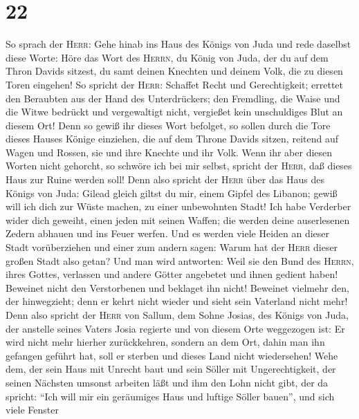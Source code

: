 \hypertarget{section-21}{%
\section{22}\label{section-21}}

 So sprach der \textsc{Herr}: Gehe hinab ins Haus des
Königs von Juda und rede daselbst diese Worte:  Höre das
Wort des \textsc{Herrn}, du König von Juda, der du auf dem Thron Davids
sitzest, du samt deinen Knechten und deinem Volk, die zu diesen Toren
eingehen!  So spricht der \textsc{Herr}: Schaffet Recht
und Gerechtigkeit; errettet den Beraubten aus der Hand des
Unterdrückers; den Fremdling, die Waise und die Witwe bedrückt und
vergewaltigt nicht, vergießet kein unschuldiges Blut an diesem Ort!
 Denn so gewiß ihr dieses Wort befolget, so sollen durch
die Tore dieses Hauses Könige einziehen, die auf dem Throne Davids
sitzen, reitend auf Wagen und Rossen, sie und ihre Knechte und ihr Volk.
 Wenn ihr aber diesen Worten nicht gehorcht, so schwöre
ich bei mir selbst, spricht der \textsc{Herr}, daß dieses Haus zur Ruine
werden soll!  Denn also spricht der \textsc{Herr} über das
Haus des Königs von Juda: Gilead gleich giltst du mir, einem Gipfel des
Libanon; gewiß will ich dich zur Wüste machen, zu einer unbewohnten
Stadt!  Ich habe Verderber wider dich geweiht, einen jeden
mit seinen Waffen; die werden deine auserlesenen Zedern abhauen und ins
Feuer werfen.  Und es werden viele Heiden an dieser Stadt
vorüberziehen und einer zum andern sagen: Warum hat der \textsc{Herr}
dieser großen Stadt also getan?  Und man wird antworten:
Weil sie den Bund des \textsc{Herrn}, ihres Gottes, verlassen und andere
Götter angebetet und ihnen gedient haben!  Beweinet nicht
den Verstorbenen und beklaget ihn nicht! Beweinet vielmehr den, der
hinwegzieht; denn er kehrt nicht wieder und sieht sein Vaterland nicht
mehr!  Denn also spricht der \textsc{Herr} von Sallum,
dem Sohne Josias, des Königs von Juda, der anstelle seines Vaters Josia
regierte und von diesem Orte weggezogen ist: Er wird nicht mehr hierher
zurückkehren,  sondern an dem Ort, dahin man ihn gefangen
geführt hat, soll er sterben und dieses Land nicht wiedersehen!
 Wehe dem, der sein Haus mit Unrecht baut und sein Söller
mit Ungerechtigkeit, der seinen Nächsten umsonst arbeiten läßt und ihm
den Lohn nicht gibt, der da spricht:  ``Ich will mir ein
geräumiges Haus und luftige Söller bauen'', und sich viele Fenster
